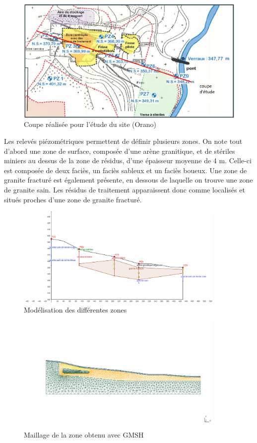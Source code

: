 \documentclass{article}
\begin{document}
\begin{figure}[H]
    \centering
    \includegraphics[width=0.8\linewidth]{III_B_3_2.png}
    \caption{Coupe réalisée pour l'étude du site (Orano) \cite{societe_areva_nc_etude_2011}}
    \label{fig:coupe_ribiere}
\end{figure}



Les relevés piézométriques permettent de définir plusieurs zones. On note tout d’abord une zone de surface, composée d’une arène granitique, et de stériles miniers au dessus de la zone de résidus, d’une épaisseur moyenne de 4 m. Celle-ci est composée de deux faciès, un faciès sableux et un faciès boueux. Une zone de granite fracturé est également présente, en dessous de laquelle on trouve une zone de granite sain. Les résidus de traitement apparaissent donc comme localisés et situés proches d’une zone de granite fracturé.

\begin{figure}[H]
    \centering
    \includegraphics[width = 0.9\textwidth]{III_B_3_3.png} 
    \caption{Modélisation des différentes zones}
    \label{fig:zones_ribieres_geogebra}
\end{figure}


\begin{figure}[H]
    \centering
        \includegraphics[width=0.9\textwidth]{III_B_3_4.png} 
        \caption{Maillage de la zone obtenu avec GMSH}
        \label{maillage_ribiere}
\end{figure}
\end{document}
